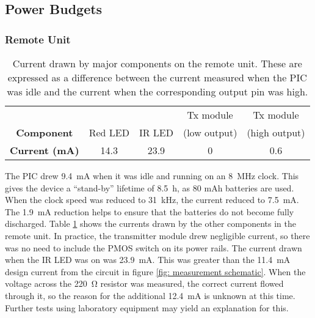 \subsection{Power Budgets}\label{power budget}
\subsubsection{Remote Unit}

\begin{table}[htb]
	\begin{center}
	\caption{Current drawn by major components on the remote unit. These are expressed as a difference between the current measured when the PIC was idle and the current when the corresponding output pin was high.}
	\label{tab: remote current}
	\begin{tabular}{|c|c|c|c|c|}
	\hline
	& & & Tx module & Tx module\\
	\textbf{Component} & Red LED & IR LED & (low output) & (high output)\\
	\hline
	\textbf{Current (mA)} & 14.3 & 23.9 & 0 & 0.6 \\
	\hline
	\end{tabular}
	\end{center}
\end{table}

The PIC drew \SI{9.4}{\milli\ampere} when it was idle and running on an \SI{8}{\mega\hertz} clock. This gives the device a ``stand-by'' lifetime of \SI{8.5}{\hour}, as 80 mAh batteries are used. When the clock speed was reduced to \SI{31}{\kilo\hertz}, the current reduced to \SI{7.5}{\milli\ampere}. The \SI{1.9}{\milli\ampere} reduction helps to ensure that the batteries do not become fully discharged. Table \ref{tab: remote current} shows the currents drawn by the other components in the remote unit. In practice, the transmitter module drew negligible current, so there was no need to include the PMOS switch on its power rails. The current drawn when the IR LED was on was \SI{23.9}{\milli\ampere}. This was greater than the \SI{11.4}{\milli\ampere} design current from the circuit in figure \ref{fig: measurement schematic}. When the voltage across the \SI{220}{\ohm} resistor was measured, the correct current flowed through it, so the reason for the additional \SI{12.4}{\milli\ampere} is unknown at this time. Further tests using laboratory equipment may yield an explanation for this.\\

